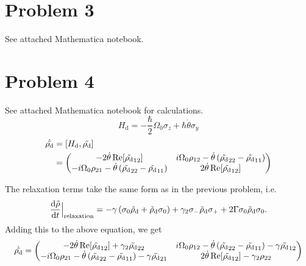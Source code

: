 \documentclass[12pt]{article}
\begin{document}
\section*{Problem 3}
See attached Mathematica notebook.

\section*{Problem 4}
See attached Mathematica notebook for calculations.
\[ H_\text{d} = -\frac{\hbar}{2}\Omega_0\sigma_z + \hbar\dot{\theta}\sigma_y \]
\begin{align*}
    \dot{\tilde{\rho_\text{d}}} &= \comm{H_\text{d}}{\tilde{\rho_\text{d}}} \\
    &= \mqty(-2\dot{\theta}\Re[\tilde{\rho_\text{d}}_{12}] & i\Omega_0\rho_{12}-\dot{\theta}\left(\tilde{\rho_\text{d}}_{22} - \tilde{\rho_\text{d}}_{11}\right) \\ -i\Omega_0\rho_{21}-\dot{\theta}\left(\tilde{\rho_\text{d}}_{22} - \tilde{\rho_\text{d}}_{11}\right) & 2\dot{\theta}\Re[\tilde{\rho_\text{d}}_{12}])
\end{align*}

The relaxation terms take the same form as in the previous problem, i.e.
\[ \dv{\tilde{\rho}}{t}\Big\vert_{\text{relaxation}} = -\gamma\left(\sigma_0\tilde{\rho}_\text{d} + \tilde{\rho}_\text{d}\sigma_0\right) + \gamma_2\sigma_-\tilde{\rho}_\text{d}\sigma_+ + 2\Gamma\sigma_0\tilde{\rho}_\text{d}\sigma_0. \]
Adding this to the above equation, we get
\[ \dot{\tilde{\rho_\text{d}}} = \mqty(-2\dot{\theta}\Re[\tilde{\rho_\text{d}}_{12}] + \gamma_2\tilde{\rho_\text{d}}_{22} & i\Omega_0\rho_{12}-\dot{\theta}\left(\tilde{\rho_\text{d}}_{22} - \tilde{\rho_\text{d}}_{11}\right) -\gamma\tilde{\rho_\text{d}}_{12} \\ -i\Omega_0\rho_{21}-\dot{\theta}\left(\tilde{\rho_\text{d}}_{22} - \tilde{\rho_\text{d}}_{11}\right) -\gamma\tilde{\rho_\text{d}}_{21} & 2\dot{\theta}\Re[\tilde{\rho_\text{d}}_{12}] - \gamma_2\rho_{22}) \]


\end{document}
